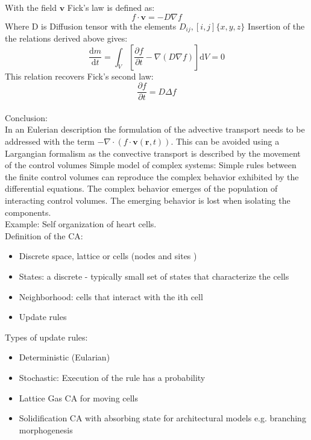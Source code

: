 \documentclass[hyperref]{labbook}
\numberwithin{equation}{experiment}
\numberwithin{table}{experiment}
\numberwithin{figure}{experiment}
\begin{document}
With the  field $\mathbf{v}$ Fick's law is defined as:
\begin{equation}
f \cdot \mathbf{v} = -{D} \nabla f
\end{equation}
Where D is Diffusion tensor with the elements $D_{ij} ,[i,j]  \{x,y,z\}$
Insertion of the the relations derived above gives: 
\begin{equation}
\frac{\mathrm{d}m}{\mathrm{d}t}  = \int_V \left[ \frac{\partial f }{\partial t } - \nabla (D\nabla f) \right]\mathrm{d}V = 0
\end{equation}
This relation recovers Fick's second law:
\begin{equation}
\frac{\partial f}{\partial t} = D \Delta f
\end{equation}\\[1em]
Conclusion: \\
In an Eulerian description the formulation of the advective transport needs to be addressed with the term $ - \nabla \cdot (f \cdot \mathbf{v}(\mathbf{r},t))$. This can be avoided using a Largangian formalism as the convective transport is described by the movement of the control volumes  
Simple model of complex systems: Simple rules between the finite control volumes can reproduce the complex behavior exhibited by the differential equations. The complex behavior emerges of the population of interacting control volumes. The emerging behavior is lost when isolating the components. \\[1em]
Example: Self organization of heart cells. \\[1em]
Definition of the CA: 
\begin{itemize}
\item Discrete space, lattice or cells (nodes and sites ) 
\item States: a discrete - typically small set of states that characterize the cells 
\item Neighborhood: cells that interact with the ith cell  
\item Update rules 
\end{itemize}
Types of update rules: 
\begin{itemize}
\item Deterministic (Eularian) 
\item Stochastic: Execution of the rule has a probability  
\item Lattice Gas CA for moving cells 
\item Solidification CA with absorbing state for architectural models e.g. branching morphogenesis
\end{itemize}
\end{document}
